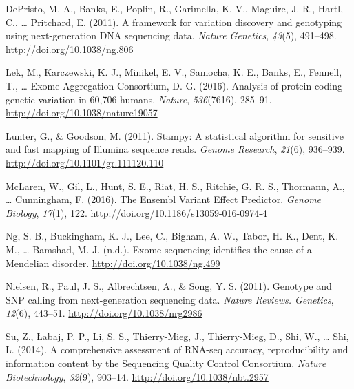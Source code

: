\documentclass[12pt,twoside]{reedthesis}
\theoremstyle{definition}
\theoremstyle{definition}
\theoremstyle{remark}
\begin{document}
  \hypertarget{ref-DePristo2011}{}
  DePristo, M. A., Banks, E., Poplin, R., Garimella, K. V., Maguire, J.
  R., Hartl, C., \ldots{} Pritchard, E. (2011). A framework for variation
  discovery and genotyping using next-generation DNA sequencing data.
  \emph{Nature Genetics}, \emph{43}(5), 491--498.
  \url{http://doi.org/10.1038/ng.806}
  
  \hypertarget{ref-Lek2016}{}
  Lek, M., Karczewski, K. J., Minikel, E. V., Samocha, K. E., Banks, E.,
  Fennell, T., \ldots{} Exome Aggregation Consortium, D. G. (2016).
  Analysis of protein-coding genetic variation in 60,706 humans.
  \emph{Nature}, \emph{536}(7616), 285--91.
  \url{http://doi.org/10.1038/nature19057}
  
  \hypertarget{ref-Lunter2011}{}
  Lunter, G., \& Goodson, M. (2011). Stampy: A statistical algorithm for
  sensitive and fast mapping of Illumina sequence reads. \emph{Genome
  Research}, \emph{21}(6), 936--939.
  \url{http://doi.org/10.1101/gr.111120.110}
  
  \hypertarget{ref-McLaren2016}{}
  McLaren, W., Gil, L., Hunt, S. E., Riat, H. S., Ritchie, G. R. S.,
  Thormann, A., \ldots{} Cunningham, F. (2016). The Ensembl Variant Effect
  Predictor. \emph{Genome Biology}, \emph{17}(1), 122.
  \url{http://doi.org/10.1186/s13059-016-0974-4}
  
  \hypertarget{ref-Ng}{}
  Ng, S. B., Buckingham, K. J., Lee, C., Bigham, A. W., Tabor, H. K.,
  Dent, K. M., \ldots{} Bamshad, M. J. (n.d.). Exome sequencing identifies
  the cause of a Mendelian disorder. \url{http://doi.org/10.1038/ng.499}
  
  \hypertarget{ref-Nielsen2011}{}
  Nielsen, R., Paul, J. S., Albrechtsen, A., \& Song, Y. S. (2011).
  Genotype and SNP calling from next-generation sequencing data.
  \emph{Nature Reviews. Genetics}, \emph{12}(6), 443--51.
  \url{http://doi.org/10.1038/nrg2986}
  
  \hypertarget{ref-Su2014}{}
  Su, Z., Łabaj, P. P., Li, S. S., Thierry-Mieg, J., Thierry-Mieg, D.,
  Shi, W., \ldots{} Shi, L. (2014). A comprehensive assessment of RNA-seq
  accuracy, reproducibility and information content by the Sequencing
  Quality Control Consortium. \emph{Nature Biotechnology}, \emph{32}(9),
  903--14. \url{http://doi.org/10.1038/nbt.2957}


\end{document}
